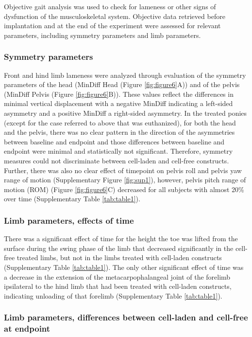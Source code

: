 \documentclass[twocolumn, empirical, authordate, issue]{jote-new-article}
\begin{document}
Objective gait analysis was used to check for lameness or other signs of dysfunction of the musculoskeletal system. Objective data retrieved before implantation and at the end of the experiment were assessed for relevant parameters, including symmetry parameters and limb parameters.

\subsubsection{Symmetry parameters} 

Front and hind limb lameness were analyzed through evaluation of the symmetry parameters of the head (MinDiff Head (Figure \ref{fig:figure6}A)) and of the pelvis (MinDiff Pelvis (Figure \ref{fig:figure6}B)). These values reflect the differences in minimal vertical displacement with a negative MinDiff indicating a left-sided asymmetry and a positive MinDiff a right-sided asymmetry. In the treated ponies (except for the case referred to above that was euthanized), for both the head and the pelvis, there was no clear pattern in the direction of the asymmetries between baseline and endpoint and those differences between baseline and endpoint were minimal and statistically not significant. Therefore, symmetry measures could not discriminate between cell-laden and cell-free constructs. Further, there was also no clear effect of timepoint on pelvis roll and pelvis yaw range of motion (Supplementary Figure \ref{fig:sup1}), however, pelvis pitch range of motion (ROM) (Figure \ref{fig:figure6}C) decreased for all subjects with almost 20\% over time (Supplementary Table \ref{tab:table1}).

\subsubsection{Limb parameters, effects of time} 

There was a significant effect of time for the height the toe was lifted from the surface during the swing phase of the limb that decreased significantly in the cell-free treated limbs, but not in the limbs treated with cell-laden constructs (Supplementary Table \ref{tab:table1}). The only other significant effect of time was a decrease in the extension of the metacarpophalangeal joint of the forelimb ipsilateral to the hind limb that had been treated with cell-laden constructs, indicating unloading of that forelimb (Supplementary Table \ref{tab:table1}).

\subsubsection{Limb parameters, differences between cell-laden and cell-free at endpoint} 
\end{document}
